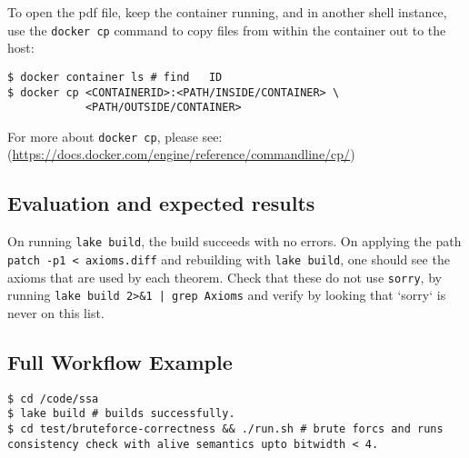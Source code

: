 \documentclass{sigplanconf}
\begin{document}
To open the pdf file, keep the container running, and in another
shell instance, use the \texttt{docker cp}
command to copy files from within the container out to the host:

\begin{verbatim}
$ docker container ls # find   ID
$ docker cp <CONTAINERID>:<PATH/INSIDE/CONTAINER> \
            <PATH/OUTSIDE/CONTAINER>
\end{verbatim}
For more about \texttt{docker cp}, please see:
(\url{https://docs.docker.com/engine/reference/commandline/cp/})


\subsection{Evaluation and expected results}

On running \texttt{lake build}, the build succeeds with no errors.
On applying the path \texttt{patch -p1 < axioms.diff} and rebuilding with \texttt{lake build},
one should see the axioms that are used by each theorem. Check that these do not use \texttt{sorry},
by running \texttt{lake build 2>\&1 | grep Axioms} and verify by looking that `sorry` is never on this list.


\subsection{Full Workflow Example}

\begin{verbatim}
$ cd /code/ssa
$ lake build # builds successfully.
$ cd test/bruteforce-correctness && ./run.sh # brute forcs and runs consistency check with alive semantics upto bitwidth < 4.
\end{verbatim}


% 
% 
% 



\end{document}
